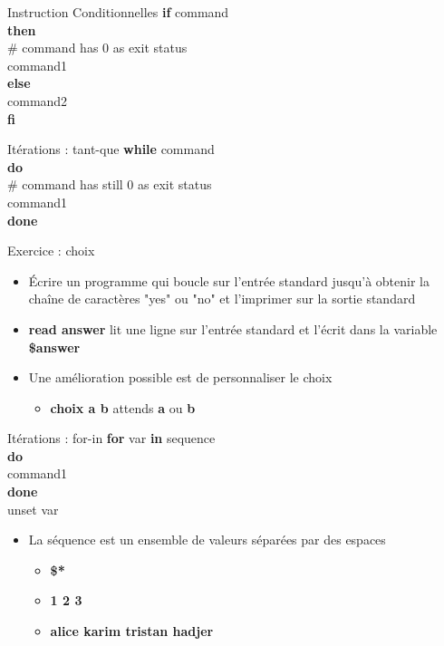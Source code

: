 \documentclass[xcolor=table]{beamer}
\begin{document}
\begin{frame}{Instruction Conditionnelles}
\textbf{if} command\\
\textbf{then}\\
\quad \# command has 0 as exit status\\
\quad command1\\
\textbf{else}\\
\quad command2\\
\textbf{fi}\\
\end{frame}

\begin{frame}{Itérations : tant-que}
\textbf{while} command\\
\textbf{do}\\
\quad \# command has still 0 as exit status\\
\quad command1\\
\textbf{done}\\
\end{frame}

\begin{frame}{Exercice : choix}
\begin{itemize}
    \item Écrire un programme qui boucle sur l'entrée standard jusqu'à obtenir la chaîne de caractères "yes" ou "no" et l'imprimer sur la sortie standard
    \item \textbf{read answer} lit une ligne sur l'entrée standard et l'écrit dans la variable \textbf{\$answer}
    \item Une amélioration possible est de personnaliser le choix
    \begin{itemize}
        \item \textbf{choix a b} attends \textbf{a} ou \textbf{b}
    \end{itemize}
\end{itemize}
\end{frame}

\begin{frame}{Itérations : for-in}
\textbf{for} var \textbf{in} sequence\\
\textbf{do}\\
\quad command1\\
\textbf{done}\\
unset var\\
\begin{itemize}
    \item La séquence est un ensemble de valeurs séparées par des espaces
    \begin{itemize}
        \item \textbf{\$*}
        \item \textbf{1 2 3}
        \item \textbf{alice karim tristan hadjer}
    \end{itemize}
\end{itemize}
\end{frame}
\end{document}
